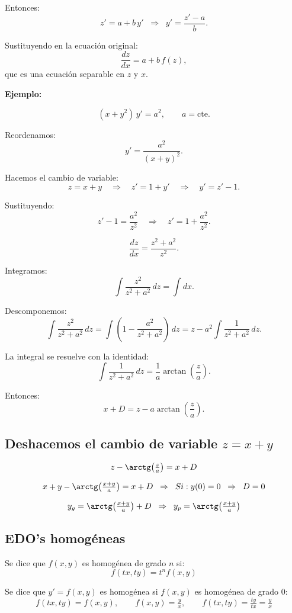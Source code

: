 \documentclass[a4paper,12pt]{article}
\begin{document}
Entonces:
\[
z' = a + b\,y' 
\;\;\Rightarrow\;\; 
y' = \frac{z'-a}{b}.
\]

Sustituyendo en la ecuación original:
\[
\frac{dz}{dx} = a + b\,f(z),
\]
que es una ecuación separable en $z$ y $x$.

\bigskip

\textbf{Ejemplo:}

\[
(x+y^2)\,y' = a^2, \qquad a = \text{cte}.
\]

Reordenamos:
\[
y' = \frac{a^2}{(x+y)^2}.
\]

Hacemos el cambio de variable:
\[
z = x+y \quad\Rightarrow\quad z' = 1 + y' \quad\Rightarrow\quad y' = z'-1.
\]

Sustituyendo:
\[
z'-1 = \frac{a^2}{z^2} \quad\Rightarrow\quad z' = 1 + \frac{a^2}{z^2}.
\]

\[
\frac{dz}{dx} = \frac{z^2+a^2}{z^2}.
\]

Integramos:
\[
\int \frac{z^2}{z^2+a^2}\,dz = \int dx.
\]

Descomponemos:
\[
\int \frac{z^2}{z^2+a^2}\,dz 
= \int \left(1 - \frac{a^2}{z^2+a^2}\right)\,dz
= z - a^2\int \frac{1}{z^2+a^2}\,dz.
\]

La integral se resuelve con la identidad:
\[
\int \frac{1}{z^2+a^2}\,dz = \frac{1}{a}\arctan\!\left(\frac{z}{a}\right).
\]

Entonces:
\[
x + D = z - a\arctan\!\left(\frac{z}{a}\right).
\]
\subsection*{Deshacemos el cambio de variable $z = x+y$}

\[
z - \arctg\!\left(\tfrac{z}{a}\right) = x + D
\]

\[
x+y - \arctg\!\left(\tfrac{x+y}{a}\right) = x + D
\;\;\Rightarrow\;\; 
Si: y(0)=0 \;\;\Rightarrow\;\; D=0
\]

\[
y_g = \arctg\!\left(\tfrac{x+y}{a}\right) + D 
\;\;\Rightarrow\;\;
y_p = \arctg\!\left(\tfrac{x+y}{a}\right)
\]

\subsection{EDO’s homogéneas}

Se dice que $f(x,y)$ es homogénea de grado $n$ si:
\[
f(tx,ty) = t^n f(x,y)
\]

Se dice que $y' = f(x,y)$ es homogénea si $f(x,y)$ es homogénea de grado 0:
\[
f(tx,ty) = f(x,y), 
\qquad 
f(x,y) = \tfrac{y}{x},
\qquad
f(tx,ty) = \tfrac{ty}{tx} = \tfrac{y}{x}
\]
\end{document}
